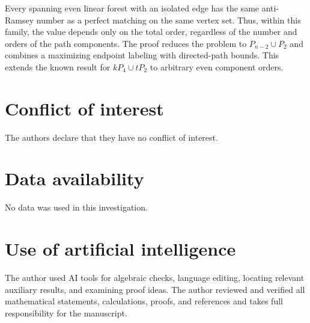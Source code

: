 \documentclass[10pt,a4paper]{article}
\begin{document}
Every spanning even linear forest with an isolated edge has the same
anti-Ramsey number as a perfect matching on the same vertex set.
Thus, within this family, the value depends only on the total order,
regardless of the number and orders of the path components. The proof
reduces the problem to $P_{n-2}\cup P_2$ and combines a maximizing
endpoint labeling with directed-path bounds. This extends the known
result for $kP_4\cup tP_2$ to arbitrary even component orders.

\section*{Conflict of interest}
The authors declare that they have no conflict of interest.

\section*{Data availability} 

No data was used in this investigation.


\section*{Use of artificial intelligence}

The author used AI tools for algebraic checks, language editing,
locating relevant auxiliary results, and examining proof ideas.
The author reviewed and verified all mathematical statements,
calculations, proofs, and references and takes full responsibility
for the manuscript.
\end{document}
